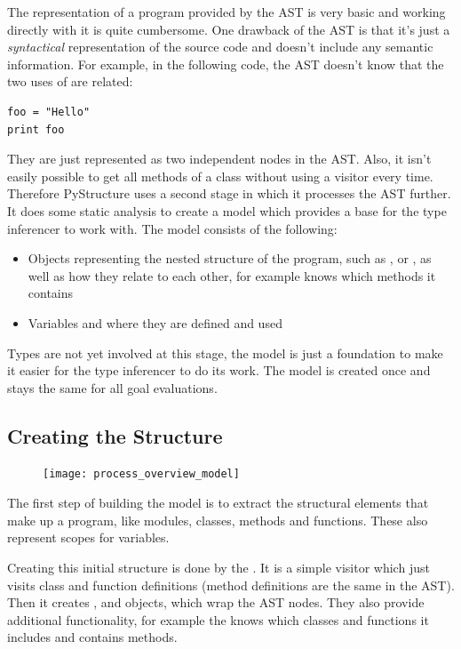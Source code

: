 \documentclass[12pt,halfparskip,DIV11,BCOR10mm]{scrreprt}
\begin{document}
The representation of a program provided by the AST is very basic and working directly with it is quite cumbersome. 
One drawback of the AST is that it's just a \emph{syntactical} representation of the source code and doesn't include any semantic information. For example, in the following code, the AST doesn't know that the two uses of  are related:

\begin{lstlisting}
foo = "Hello"
print foo
\end{lstlisting}

They are just represented as two independent  nodes in the AST. Also, it isn't easily possible to get all methods of a class without using a visitor every time. Therefore PyStructure uses a second stage in which it processes the AST further. It does some static analysis to create a model which provides a base for the type inferencer to work with. The model consists of the following:

\begin{itemize}
	\item Objects representing the nested structure of the program, such as ,  or , as well as how they relate to each other, for example  knows which methods it contains
	\item Variables and where they are defined and used
\end{itemize}

Types are not yet involved at this stage, the model is just a foundation to make it easier for the type inferencer to do its work. The model is created once and stays the same for all goal evaluations.

\subsection{Creating the Structure}

\begin{figure}
		\vspace{-0.5cm}
    \texttt{[image: process\_overview\_model]}
		\vspace{0cm}
\end{figure}

The first step of building the model is to extract the structural elements that make up a program, like modules, classes, methods and functions. These also represent scopes for variables.

Creating this initial structure is done by the . It is a simple visitor which just visits class and function definitions (method definitions are the same in the AST). Then it creates ,  and  objects, which wrap the AST nodes. They also provide additional functionality, for example the  knows which classes and functions it includes and  contains methods.
\end{document}
